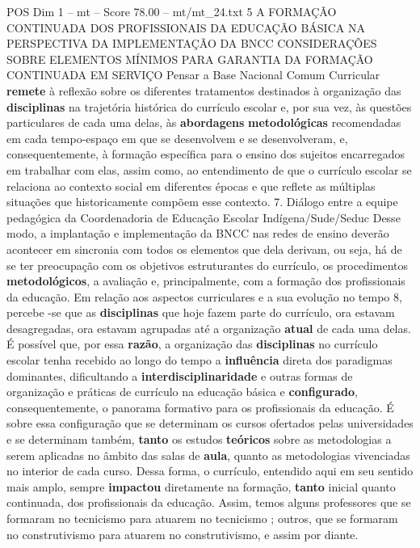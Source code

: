 \begin{textsample}{POS Dim 1 – mt – Score 78.00 – mt/mt\_24.txt}  \label{ex:f1_pos_071}
5 A FORMAÇÃO CONTINUADA DOS PROFISSIONAIS DA EDUCAÇÃO BÁSICA NA PERSPECTIVA DA IMPLEMENTAÇÃO DA BNCC CONSIDERAÇÕES SOBRE ELEMENTOS MÍNIMOS PARA GARANTIA DA FORMAÇÃO CONTINUADA EM SERVIÇO Pensar a Base Nacional Comum Curricular \textbf{remete} à reflexão sobre os diferentes tratamentos destinados à organização das \textbf{disciplinas} na trajetória histórica do currículo escolar e, por sua vez, às questões particulares de cada uma delas, às \textbf{abordagens} \textbf{metodológicas} recomendadas em cada tempo-espaço em que se desenvolvem e se desenvolveram, e, consequentemente, à formação específica para o ensino dos sujeitos encarregados em trabalhar com elas, assim como, ao entendimento de que o currículo escolar se relaciona ao contexto social em diferentes épocas e que reflete as múltiplas situações que historicamente compõem esse contexto. 7.
Diálogo entre a equipe pedagógica da Coordenadoria de Educação Escolar Indígena/Sude/Seduc Desse modo, a implantação e implementação da BNCC nas redes de ensino deverão acontecer em sincronia com todos os elementos que dela derivam, ou seja, há de se ter preocupação com os objetivos estruturantes do currículo, os procedimentos \textbf{metodológicos}, a avaliação e, principalmente, com a formação dos profissionais da educação.
Em relação aos aspectos curriculares e a sua evolução no tempo 8, percebe -se que as \textbf{disciplinas} que hoje fazem parte do currículo, ora estavam desagregadas, ora estavam agrupadas até a organização \textbf{atual} de cada uma delas.
É possível que, por essa \textbf{razão}, a organização das \textbf{disciplinas} no currículo escolar tenha recebido ao longo do tempo a \textbf{influência} direta dos paradigmas dominantes, dificultando a \textbf{interdisciplinaridade} e outras formas de organização e práticas de currículo na educação básica e \textbf{configurado}, consequentemente, o panorama formativo para os profissionais da educação.
É sobre essa configuração que se determinam os cursos ofertados pelas universidades e se determinam também, \textbf{tanto} os estudos \textbf{teóricos} sobre as metodologias a serem aplicadas no âmbito das salas de \textbf{aula}, quanto as metodologias vivenciadas no interior de cada curso.
Dessa forma, o currículo, entendido aqui em seu sentido mais amplo, sempre \textbf{impactou} diretamente na formação, \textbf{tanto} inicial quanto continuada, dos profissionais da educação.
Assim, temos alguns professores que se formaram no tecnicismo para atuarem no tecnicismo ; outros, que se formaram no construtivismo para atuarem no construtivismo, e assim por diante.

\end{textsample}
